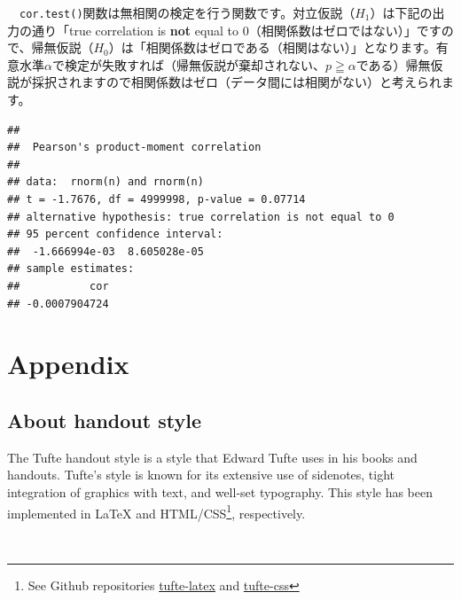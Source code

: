 \documentclass[]{tufte-handout}
\begin{document}
　\texttt{cor.test()}関数は無相関の検定を行う関数です。対立仮説（\(H_1\)）は下記の出力の通り「true
correlation is \textbf{not} equal to
0（相関係数はゼロではない）」ですので、帰無仮説（\(H_0\)）は「相関係数はゼロである（相関はない）」となります。有意水準\(\alpha\)で検定が失敗すれば（帰無仮説が棄却されない、\(p \geqq \alpha\)である）帰無仮説が採択されますので相関係数はゼロ（データ間には相関がない）と考えられます。

\begin{verbatim}
## 
##  Pearson's product-moment correlation
## 
## data:  rnorm(n) and rnorm(n)
## t = -1.7676, df = 4999998, p-value = 0.07714
## alternative hypothesis: true correlation is not equal to 0
## 95 percent confidence interval:
##  -1.666994e-03  8.605028e-05
## sample estimates:
##           cor 
## -0.0007904724
\end{verbatim}

\newpage

\hypertarget{appendix}{%
\section{Appendix}\label{appendix}}

\hypertarget{about-handout-style}{%
\subsection{About handout style}\label{about-handout-style}}

The Tufte handout style is a style that Edward Tufte uses in his books
and handouts. Tufte's style is known for its extensive use of sidenotes,
tight integration of graphics with text, and well-set typography. This
style has been implemented in LaTeX and HTML/CSS\footnote{See Github
  repositories
  \href{https://github.com/tufte-latex/tufte-latex}{tufte-latex} and
  \href{https://github.com/edwardtufte/tufte-css}{tufte-css}},
respectively.

　


\end{document}

